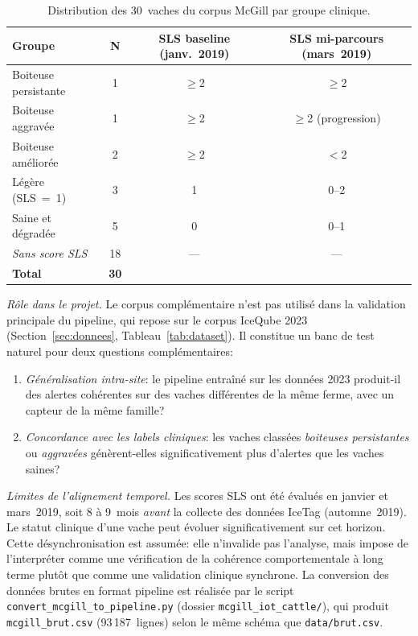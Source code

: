 \begin{table}[H]
    \centering
    \small
    \caption{Distribution des 30~vaches du corpus McGill par groupe clinique.}
    \label{tab:mcgill_sls_groups}
    \begin{tabular}{lccc}
        \toprule
        \textbf{Groupe} & \textbf{N} &
        \textbf{SLS baseline (janv.~2019)} &
        \textbf{SLS mi-parcours (mars~2019)} \\
        \midrule
        Boiteuse persistante  & 1 & $\geq$2 & $\geq$2 \\
        Boiteuse aggravée     & 1 & $\geq$2 & $\geq$2 (progression) \\
        Boiteuse améliorée    & 2 & $\geq$2 & $<$2 \\
        Légère (SLS~=~1)      & 3 & 1       & 0--2 \\
        Saine et dégradée     & 5 & 0       & 0--1 \\
        \midrule
        \textit{Sans score SLS} & 18 & — & — \\
        \midrule
        \textbf{Total}        & \textbf{30} & & \\
        \bottomrule
    \end{tabular}
\end{table}

\textit{Rôle dans le projet.}
Le corpus complémentaire n'est pas utilisé dans la validation principale du pipeline, qui repose sur le
corpus IceQube 2023 (Section~\ref{sec:donnees},
Tableau~\ref{tab:dataset}). Il constitue un banc de test naturel pour deux questions
complémentaires:
\begin{enumerate}
    \item \textit{Généralisation intra-site}: le pipeline entraîné sur les données 2023
    produit-il des alertes cohérentes sur des vaches différentes de la même ferme,
    avec un capteur de la même famille?
    \item \textit{Concordance avec les labels cliniques}: les vaches classées
    \textit{boiteuses persistantes} ou \textit{aggravées} génèrent-elles
    significativement plus d'alertes que les vaches saines?
\end{enumerate}

\textit{Limites de l'alignement temporel.}
Les scores SLS ont été évalués en janvier et mars~2019, soit 8 à 9~mois \textit{avant}
la collecte des données IceTag (automne~2019). Le statut clinique d'une vache peut évoluer
significativement sur cet horizon. Cette désynchronisation est assumée: elle n'invalide pas
l'analyse, mais impose de l'interpréter comme une vérification de la cohérence
comportementale à long terme plutôt que comme une validation clinique synchrone.
La conversion des données brutes en format pipeline est réalisée par le script
\texttt{convert\_mcgill\_to\_pipeline.py} (dossier \texttt{mcgill\_iot\_cattle/}), qui
produit \texttt{mcgill\_brut.csv} (93\,187~lignes) selon le même schéma que
\texttt{data/brut.csv}.

